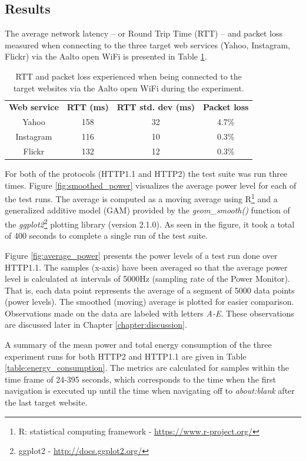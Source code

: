 \documentclass{article}
\begin{document}
\subsection{Results}
\label{chapter:results}

The average network latency -- or Round Trip Time (RTT) -- and packet loss measured when connecting to the three target web services (Yahoo, Instagram, Flickr) via the Aalto open WiFi is presented in Table \ref{table:latency}.

\begin{table}[h!]
    \centering
    \begin{tabular}{c|c|c|c}
         \textbf{Web service} & \textbf{RTT (ms)} & \textbf{RTT std. dev (ms)} & \textbf{Packet loss} \\
        Yahoo   & 158 & 32 & 4.7\% \\
        Instagram  & 116 & 10 & 0.3\% \\
        Flickr & 132 & 12 & 0.3\% \\
    \end{tabular}
    \caption{RTT and packet loss experienced when being connected to the target websites via the Aalto open WiFi during the experiment.}
    \label{table:latency}
\end{table}

For both of the protocols (HTTP1.1 and HTTP2) the test suite was run three times. Figure \ref{fig:smoothed_power} visualizes the average power level for each of the test runs. The average is computed as a moving average using R\footnote{R: statistical computing framework - \url{https://www.r-project.org/}} and a generalized additive model (GAM) provided by the \emph{geom\_smooth()} function of the \emph{ggplot2}\footnote{ggplot2 - \url{http://docs.ggplot2.org/}} plotting library (version 2.1.0). As seen in the figure, it took a total of 400 seconds to complete a single run of the test suite.

Figure \ref{fig:average_power} presents the power levels of a test run done over HTTP1.1. The samples (x-axis) have been averaged so that the average power level is calculated at intervals of 5000Hz (sampling rate of the Power Monitor). That is, each data point represents the average of a segment of 5000 data points (power levels). The smoothed (moving) average is plotted for easier comparison. Observations made on the data are labeled with letters \emph{A-E}. These observations are discussed later in Chapter \ref{chapter:discussion}.

A summary of the mean power and total energy consumption of the three experiment runs for both HTTP2 and HTTP1.1 are given in Table \ref{table:energy_consumption}. The metrics are calculated for samples within the time frame of 24-395 seconds, which corresponds to the time when the first navigation is executed up until the time when navigating off to \emph{about:blank} after the last target website.
\end{document}
